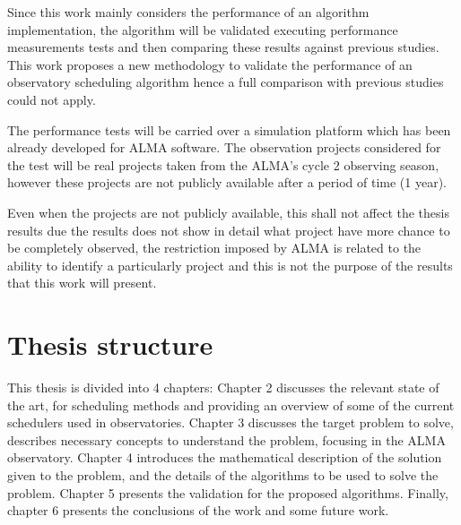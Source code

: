 Since this work mainly considers the performance of an algorithm implementation, the algorithm will be validated
executing performance measurements tests and then comparing these results against previous
studies. This work proposes a new methodology to validate the performance of an observatory
scheduling algorithm hence a full comparison with previous studies could not apply.

The performance tests will be carried over a simulation platform which has been already
developed for ALMA software. The observation projects considered for the test will be real
projects taken from the ALMA’s cycle 2 observing season, however these projects are not publicly
available after a period of time (1 year).

Even when the projects are not publicly available, this shall not affect the thesis results due the
results does not show in detail what project have more chance to be completely observed, the
restriction imposed by ALMA is related to the ability to identify a particularly project and this is
not the purpose of the results that this work will present.

\section{Thesis structure}
This thesis is divided into 4 chapters: Chapter 2 discusses the relevant state of the art, for scheduling methods and providing an overview of some of the current schedulers used in observatories. Chapter 3 discusses the target problem to solve, describes necessary concepts to understand the problem, focusing in the ALMA observatory. Chapter 4 introduces the mathematical description of the solution given to the problem, and the details of the algorithms to be used to solve the problem. Chapter 5 presents the validation for the proposed algorithms. Finally, chapter 6 presents the conclusions of the work and some future work.